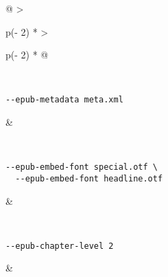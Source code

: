 \begin{longtable}[]{@{}
  >{\raggedright\arraybackslash}p{(\columnwidth - 2\tabcolsep) * }
  >{\raggedright\arraybackslash}p{(\columnwidth - 2\tabcolsep) * }@{}}
\begin{minipage}[t]{\linewidth}
\begin{Shaded}
\begin{Highlighting}[]
\KeywordTok{:}
\end{Highlighting}
\end{Shaded}
\end{minipage} \\
\begin{minipage}[t]{\linewidth}\raggedright
\begin{verbatim}
--epub-metadata meta.xml
\end{verbatim}
\end{minipage} & \begin{minipage}[t]{\linewidth}\raggedright
\begin{Shaded}
\begin{Highlighting}[]
\KeywordTok{:}
\end{Highlighting}
\end{Shaded}
\end{minipage} \\
\begin{minipage}[t]{\linewidth}\raggedright
\begin{verbatim}
--epub-embed-font special.otf \
  --epub-embed-font headline.otf
\end{verbatim}
\end{minipage} & \begin{minipage}[t]{\linewidth}\raggedright
\begin{Shaded}
\begin{Highlighting}[]
\KeywordTok{:}
\AttributeTok{  }\KeywordTok{{-}}
\AttributeTok{  }\KeywordTok{{-}}
\end{Highlighting}
\end{Shaded}
\end{minipage} \\
\begin{minipage}[t]{\linewidth}\raggedright
\begin{verbatim}
--epub-chapter-level 2
\end{verbatim}
\end{minipage} & \begin{minipage}[t]{\linewidth}\raggedright
\begin{Shaded}
\begin{Highlighting}[]
\KeywordTok{:}\AttributeTok{ }

\end{Highlighting}
\end{Shaded}
\end{minipage}
\end{longtable}

